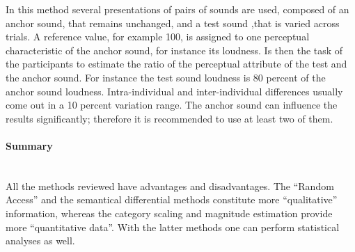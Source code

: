 In this method several presentations of pairs of sounds are used, composed of an
anchor sound, that remains unchanged, and a test sound ,that is varied across
trials. A reference value, for example 100, is assigned to one perceptual
characteristic of the anchor sound, for instance its loudness. Is then the task
of the participants to estimate the ratio of the perceptual attribute of the
test and the anchor sound. For instance the test sound loudness is 80 percent of
the anchor sound loudness. Intra-individual and inter-individual differences
usually come out in a 10 percent variation range. The anchor sound can influence
the results significantly; therefore it is recommended to use at least two of
them.

\paragraph{Summary} ~\\
All the methods reviewed have advantages and disadvantages. The ``Random
Access'' and the semantical differential methods constitute more ``qualitative''
information, whereas the category scaling and magnitude estimation provide more
``quantitative data''. With the latter methods one can perform statistical 
analyses as well.
